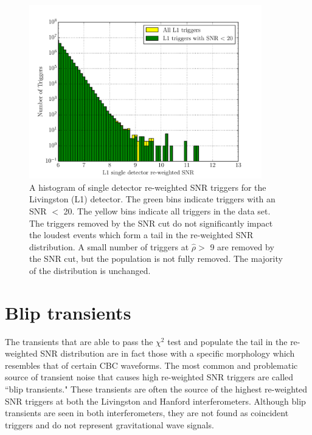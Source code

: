 \begin{figure}[!ht]%
\centering
  \includegraphics[width=0.9\textwidth]{figures/o1-cbc-dq-paper/L1-newsnr-histogram-compare-SNR-LT-20}
  \caption[Re-weighted SNR histogram with SNR $>$ 20 cut]{A histogram of single detector re-weighted SNR triggers for the Livingston (L1) detector. %
           The green bins indicate triggers %
           with an SNR $<$ 20. The yellow bins indicate all triggers in the data set. %
           The triggers removed by the SNR cut do not significantly impact the loudest events %
           which form a tail in the re-weighted SNR distribution. A small number of triggers %
           at $\hat{\rho} >$ 9 are removed by the SNR cut, but the population is not %
           fully removed. The majority of the distribution is unchanged.}
\label{fig:SNR-LT-20-comparison}
\end{figure}

\section{Blip transients}

The transients that are able to pass the $\chi^{2}$ test and populate the tail in the re-weighted SNR
distribution are in fact those with a specific morphology which resembles that of
certain CBC waveforms. The most common and problematic source of transient noise that causes high
re-weighted SNR triggers are called ``blip transients." These transients are often the source of
the highest re-weighted SNR triggers at both the Livingston and Hanford interferometers.
Although blip transients are seen in both interferometers, they are not found as coincident
triggers and do not represent gravitational wave signals.


